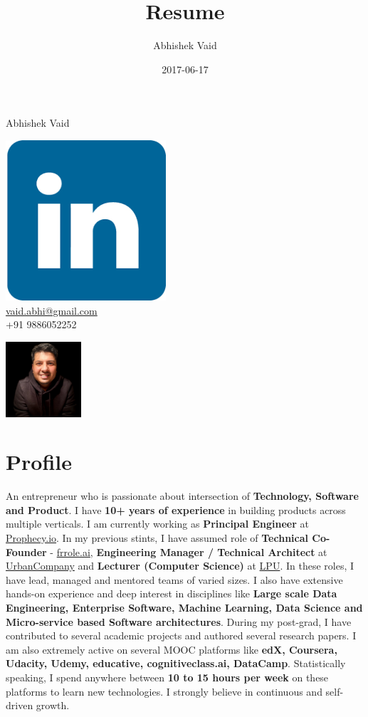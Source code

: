 \documentclass{article}
\title{Resume}
\date{2017-06-17}
\author{Abhishek Vaid}
\begin{document}
\begin{huge} 
	\noindent Abhishek Vaid \hspace{1ex}
\end{huge} \href{http://linkedin.com/in/vaidabhishek86}{\includegraphics[height=4ex]{linkedin}}
\\
\noindent \href{mailto: vaid.abhi@gmail.com}{vaid.abhi@gmail.com} \\+91 9886052252\\   
\vspace{-95pt}
\begin{flushright}
\includegraphics[width=2.8cm]{vaid}
\end{flushright}
 \vspace{-15pt}
\section{Profile}

\ifresearch
An entrepreneur who is passionate about intersection of \textbf{Technology, Software and Product}. I have \textbf{10+ years of experience} in building products across multiple verticals. I am currently working as \textbf{Principal Engineer} at \href{https://www.prophecy.io}{Prophecy.io}. In my previous stints, I have assumed role of \textbf{Technical Co-Founder} - \href{https://frrole.ai/}{frrole.ai}, \textbf{Engineering Manager / Technical Architect} at \href{https://www.urbancompany.com/delhi-ncr}{UrbanCompany} and \textbf{Lecturer (Computer Science)} at \href{lpu.in}{LPU}. In these roles, I have lead, managed and mentored teams of varied sizes. I also have extensive hands-on experience and deep interest in disciplines like \textbf{Large scale Data Engineering, Enterprise Software, Machine Learning, Data Science and Micro-service based Software architectures}. During my post-grad, I have contributed to several academic projects and authored several research papers. I am also extremely active on several MOOC platforms like \textbf{edX, Coursera, Udacity, Udemy, educative, cognitiveclass.ai, DataCamp}. Statistically speaking, I spend anywhere between \textbf{10 to 15 hours per week} on these platforms to learn new technologies. I strongly believe in continuous and self-driven growth.
\else
\end{document}
